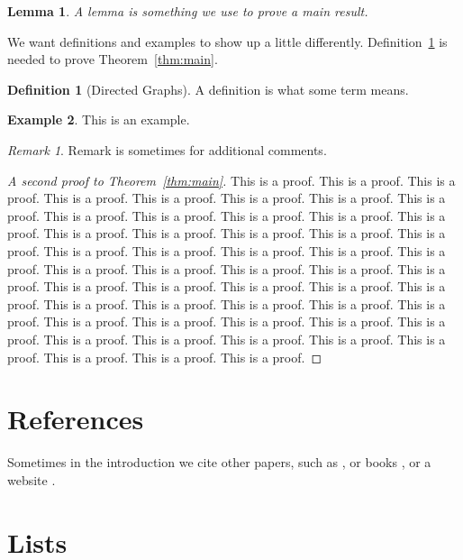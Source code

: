 \documentclass{article}
\newtheorem{lem}[thm]{Lemma}
\theoremstyle{definition}
\newtheorem{defi}{Definition}[section]
\newtheorem{exam}[defi]{Example}
\theoremstyle{remark}
\newtheorem*{rem}{Remark}
\begin{document}
\begin{lem}
A lemma is something we use to prove a main result.
\end{lem}

We want definitions and examples to show up a little differently. Definition~\ref{defi:dig} is needed to prove Theorem~\ref{thm:main}.

\begin{defi}[Directed Graphs]
\label{defi:dig}
A definition is what some term means.
\end{defi}

\begin{exam}
This is an example.
\end{exam}

\begin{rem}
Remark is sometimes for additional comments.
\end{rem}

\begin{proof}[A second proof to Theorem~\ref{thm:main}]
This is a proof. This is a proof. This is a proof. This is a proof. This is a proof. This is a proof. This is a proof. This is a proof. This is a proof. This is a proof. This is a proof. This is a proof. This is a proof. This is a proof. This is a proof. This is a proof. This is a proof. This is a proof. This is a proof. This is a proof. This is a proof. This is a proof. This is a proof. This is a proof. This is a proof. This is a proof. This is a proof. This is a proof. This is a proof. This is a proof. This is a proof. This is a proof. This is a proof. This is a proof. This is a proof. This is a proof. This is a proof. This is a proof. This is a proof. This is a proof. This is a proof. This is a proof. This is a proof. This is a proof. This is a proof. This is a proof. This is a proof. This is a proof. This is a proof. This is a proof. This is a proof. 
\end{proof}

\section{References}

Sometimes in the introduction we cite other papers, such as \cite{ARTICLE:1}, or books \cite{BOOK:1, BOOK:2}, or a website \cite{WEBSITE:1}.

\section{Lists}
\end{document}

